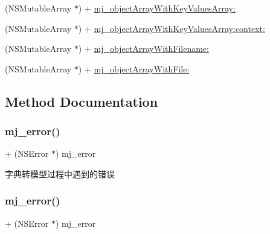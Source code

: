 \begin{DoxyCompactItemize}
\item 
(N\+S\+Mutable\+Array $\ast$) + \mbox{\hyperlink{category_n_s_object_07_m_j_key_value_08_a4bbc4da54fe5f2fddc993aad366ff617}{mj\+\_\+object\+Array\+With\+Key\+Values\+Array\+:}}
\item 
(N\+S\+Mutable\+Array $\ast$) + \mbox{\hyperlink{category_n_s_object_07_m_j_key_value_08_a38ad57bdfe18e6432c8dc94569c3be7d}{mj\+\_\+object\+Array\+With\+Key\+Values\+Array\+:context\+:}}
\item 
(N\+S\+Mutable\+Array $\ast$) + \mbox{\hyperlink{category_n_s_object_07_m_j_key_value_08_a6e179d7da5def0fe40427b4982a68591}{mj\+\_\+object\+Array\+With\+Filename\+:}}
\item 
(N\+S\+Mutable\+Array $\ast$) + \mbox{\hyperlink{category_n_s_object_07_m_j_key_value_08_ac15e292cdd35db5aae0215cea1e4ff7e}{mj\+\_\+object\+Array\+With\+File\+:}}
\end{DoxyCompactItemize}


\subsection{Method Documentation}
\mbox{\label{category_n_s_object_07_m_j_key_value_08_ab6e5a0c2a22f66eda49c4d13327f7607}} 
\subsubsection{\texorpdfstring{mj\+\_\+error()}{mj\_error()}\hspace{0.1cm}{\footnotesize\ttfamily [1/3]}}
{\footnotesize\ttfamily + (N\+S\+Error $\ast$) mj\+\_\+error \begin{DoxyParamCaption}{ }\end{DoxyParamCaption}}

字典转模型过程中遇到的错误 \mbox{\label{category_n_s_object_07_m_j_key_value_08_ab6e5a0c2a22f66eda49c4d13327f7607}} 
\subsubsection{\texorpdfstring{mj\+\_\+error()}{mj\_error()}\hspace{0.1cm}{\footnotesize\ttfamily [2/3]}}
{\footnotesize\ttfamily + (N\+S\+Error $\ast$) mj\+\_\+error \begin{DoxyParamCaption}{ }\end{DoxyParamCaption}}

